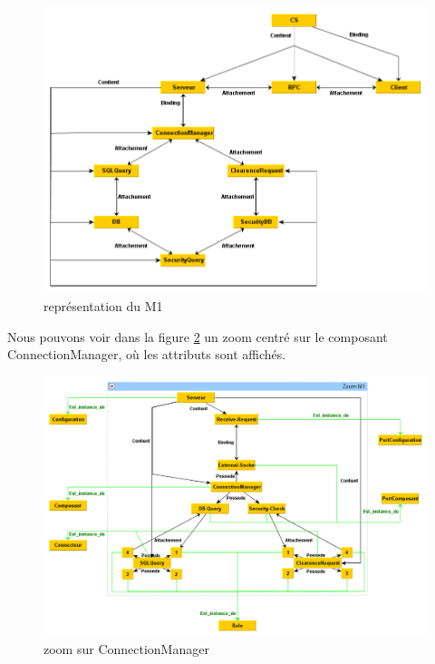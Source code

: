 	\begin{figure}[!h]
		\centering
		\includegraphics[scale=0.5]{../images/m1}
		\caption{représentation du M1}
		\label{m1}
	\end{figure}
	
Nous pouvons voir dans la figure \ref{zoom_m1} un zoom centré sur le composant
ConnectionManager, où les attributs sont affichés.

	\begin{figure}[!h]
		\centering
		\includegraphics[scale=0.5]{../images/zoom_m1}
		\caption{zoom sur ConnectionManager}
		\label{zoom_m1}
	\end{figure}
	
\clearpage